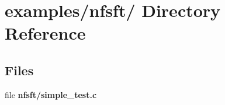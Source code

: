 \hypertarget{dir_000031}{
\section{examples/nfsft/ Directory Reference}
\label{dir_000031}
}
\subsection*{Files}
\begin{CompactItemize}
\item 
file {\bf nfsft/simple\_\-test.c}
\end{CompactItemize}
